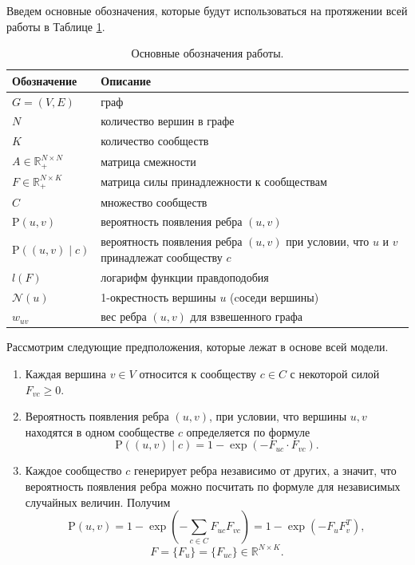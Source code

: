 \documentclass{ITaSconf}
\def\PP{\mathrm{P}}
\begin{document}
Введем основные обозначения, которые будут использоваться на протяжении всей работы в Таблице \ref{table:notation}. 
\begin{table}[!t]
	{
	\centering
	\small
	\begin{tabular}{ p{5.5em}   p{17.5em} }
		\hline
		\hline
		Обозначение 						& Описание \\
		\hline
		$G = (V,E) $ 						& граф \\             
		$N$    								& количество вершин в графе \\  
		$K$    								& количество сообществ \\      
		$A \in \mathbb{R}_{+}^{N\times N}$  & матрица смежности   \\
		$F \in \mathbb{R}_{+}^{N\times K}$  & матрица силы принадлежности к сообществам			\\
		$C$    								& множество сообществ  \\
		$\PP(u,v)$							& вероятность появления ребра $(u,v)$ \\
		$\PP((u,v) \mid c)$ 					& вероятность появления ребра $(u,v)$ при условии, что $u$ и $v$ принадлежат сообществу $c$ \\
		
		$l(F)$								& логарифм функции правдоподобия \\
		$\mathcal{N}(u)$ 					& 1-окрестность вершины $u$ (cоседи вершины) \\
		$w_{uv}$							& вес ребра $(u,v)$ для взвешенного графа \\
		\hline
		\hline
	\end{tabular}
	}
	\caption{Основные обозначения работы.}
	\label{table:notation}
\end{table}
Рассмотрим следующие предположения, которые лежат в основе всей модели.
\begin{enumerate}
	\item Каждая вершина $v\in V$ относится к сообществу $c \in C$ с некоторой силой
	$F_{vc} \ge 0.$
	\item Вероятность появления ребра $(u,v)$, при условии, что вершины $u,v$ находятся в одном сообществе $c$ определяется по формуле 
	$$\PP((u,v) \mid c)=1 - \exp(-F_{uc}\cdot F_{vc}).$$
	\item Каждое сообщество $c$ генерирует ребра независимо от других, а значит, что вероятность появления ребра можно посчитать по формуле для независимых случайных величин. Получим
	$$\PP(u,v)=1 - \exp(-\sum_{c\in C} F_{uc} F_{vc}) = 1 - \exp( - F_{u} F_{v}^T),$$
	$$F = \{F_u\} = \{F_{uc}\} \in \mathbb {R}^{N \times K}. $$
\end{enumerate}
\end{document}
